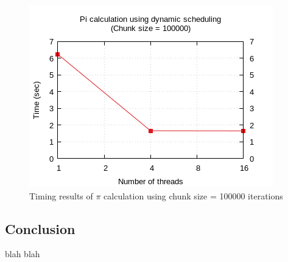 \documentclass{article}
\begin{document}
\begin{figure}[htbp]
  \centering
  \includegraphics[width=0.55\columnwidth]{../ex1/plots/pi_c100000.png}
  \caption{Timing results of $\pi$ calculation using chunk size = 100000 iterations}
\end{figure}

\pagebreak
\subsection{Conclusion}
blah blah
\end{document}
